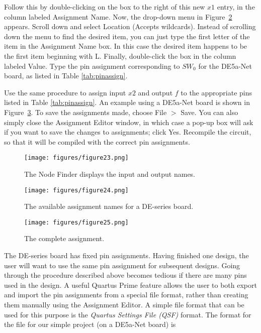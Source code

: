 Follow this by double-clicking on the box to the right of this new $x1$ entry, in the column
labeled Assignment Name. Now, the drop-down menu in Figure~\ref{fig:24} appears. Scroll down and select 
{\sf Location (Accepts wildcards)}. Instead of scrolling down the menu to find the desired item, 
you can just type the first letter of the item in the Assignment Name box. In this case the desired
item happens to be the first item beginning with L. Finally, double-click the box in the column labeled Value.
Type the pin assignment corresponding to $SW_0$ for the DE5a-Net board, as listed in Table \ref{tab:pinassign}.

Use the same procedure to assign input $x2$ and output $f$ to the appropriate pins listed in
Table \ref{tab:pinassign}. An example using a DE5a-Net board is shown in Figure~\ref{fig:25}.
To save the assignments made, choose {\sf File $>$ Save}. You can also simply close 
the Assignment Editor window, in which case a pop-up box will ask if you want to save
the changes to assignments; click {\sf Yes}.
Recompile the circuit, so that it will be compiled with the correct pin assignments.


\begin{figure}[H]
   \begin{center}
      \texttt{[image: figures/figure23.png]}
   \caption{The Node Finder displays the input and output names.} 
	 \label{fig:23}
	 \end{center}
\end{figure}

\begin{figure}[H]
   \begin{center}
      \texttt{[image: figures/figure24.png]}
   \caption{The available assignment names for a DE-series board.} 
	 \label{fig:24}
	 \end{center}
\end{figure}


\begin{figure}[H]
   \begin{center}
      \texttt{[image: figures/figure25.png]}
   \caption{The complete assignment.} 
	 \label{fig:25}
	 \end{center}
\end{figure}

The DE-series board has fixed pin assignments. Having finished one design, the user will want
to use the same pin assignment for subsequent designs. Going through the procedure 
described above becomes tedious if there are many pins used in the design.
A useful Quartus Prime feature allows the user to both
export and import the pin assignments from a special file format, 
rather than creating them manually
using the Assignment Editor. A simple file format that can be used for this purpose
is the {\it Quartus Settings File (QSF)} format. The format for the file for our simple project (on a DE5a-Net board) is

